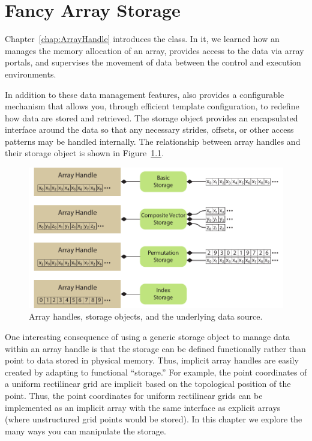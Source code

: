 
\chapter{Fancy Array Storage}
\label{chap:Storage}


Chapter~\ref{chap:ArrayHandle} introduces the  class.
In it, we learned how an  manages the
memory allocation of an array, provides access to the data via array
portals, and supervises the movement of data between the control and
execution environments.


In addition to these data management features, 
also provides a configurable  mechanism that allows you,
through efficient template configuration, to redefine how data are stored
and retrieved. The storage object provides an encapsulated interface around
the data so that any necessary strides, offsets, or other access patterns
may be handled internally. The relationship between array handles and their
storage object is shown in Figure~\ref{fig:ArrayHandleStorage}.

\begin{figure}[htb]
  \centering
  \includegraphics{images/ArrayHandleStorage}
  \caption{Array handles, storage objects, and the underlying data source.}
  \label{fig:ArrayHandleStorage}
\end{figure}

One interesting consequence of using a generic storage object to manage
data within an array handle is that the storage can be defined
functionally rather than point to data stored in physical memory. Thus,
implicit array handles are easily created by adapting to functional
``storage.'' For example, the point coordinates of a uniform rectilinear
grid are implicit based on the topological position of the point. Thus, the
point coordinates for uniform rectilinear grids can be implemented as an
implicit array with the same interface as explicit arrays (where
unstructured grid points would be stored). In this chapter we explore the
many ways you can manipulate the  storage.

